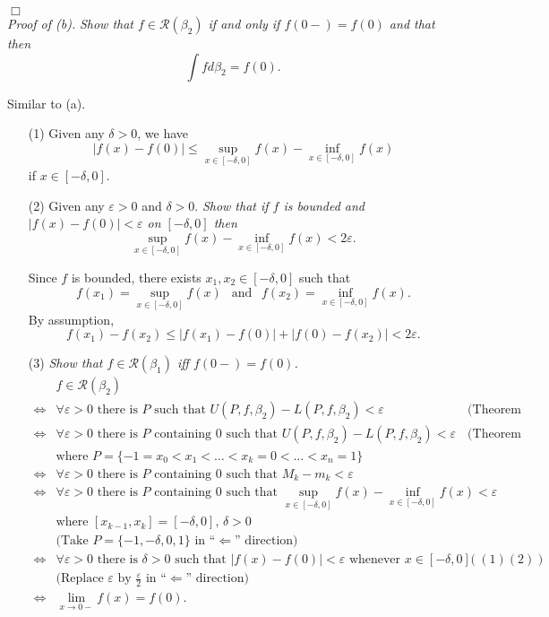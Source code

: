 \documentclass{article}
\begin{document}
$\Box$ \\



\emph{Proof of (b).}
\emph{Show that $f \in \mathscr{R}(\beta_2)$ if and only if $f(0-) = f(0)$ and that then
\[
  \int f d\beta_2 = f(0).
\]}

Similar to (a).
\begin{enumerate}
\item[(1)]
  Given any $\delta > 0$,
  we have
  \[
    |f(x) - f(0)| \leq \sup_{x\in[-\delta,0]} f(x) - \inf_{x\in[-\delta,0]} f(x)
  \]
  if $x \in [-\delta,0]$.

\item[(2)]
  Given any $\varepsilon > 0$ and $\delta > 0$.
  \emph{Show that if $f$ is bounded and $|f(x) - f(0)| < \varepsilon$ on $[-\delta,0]$ then
  \[
    \sup_{x\in[-\delta,0]} f(x) - \inf_{x\in[-\delta,0]} f(x) < 2\varepsilon.
  \]}

  Since $f$ is bounded, there exists $x_1,x_2 \in [-\delta,0]$
  such that
  \[
    f(x_1) = \sup_{x\in[-\delta,0]} f(x) \:\: \text{ and } \:\:
    f(x_2) = \inf_{x\in[-\delta,0]} f(x).
  \]
  By assumption,
  \[
    f(x_1) - f(x_2) \leq |f(x_1) - f(0)| + |f(0) - f(x_2)| < 2\varepsilon.
  \]

\item[(3)]
\emph{Show that $f \in \mathscr{R}(\beta_1)$ iff $f(0-) = f(0)$.}
  \begin{align*}
    &f \in \mathscr{R}(\beta_2) \\
    \Longleftrightarrow&
      \text{$\forall \varepsilon > 0$ there is $P$ such that
      $U(P,f,\beta_2) - L(P,f,\beta_2) < \varepsilon$}
        &\text{(Theorem 6.6)} \\
    \Longleftrightarrow&
      \text{$\forall \varepsilon > 0$ there is $P$ containing $0$ such that
      $U(P,f,\beta_2) - L(P,f,\beta_2) < \varepsilon$}
        &\text{(Theorem 6.4)} \\
      &\text{where $P = \{-1 = x_0 < x_1 < \ldots < x_k = 0 < \ldots < x_n = 1\}$} \\
    \Longleftrightarrow&
      \text{$\forall \varepsilon > 0$ there is $P$ containing $0$ such that
      $M_{k} - m_{k} < \varepsilon$} \\
    \Longleftrightarrow&
      \text{$\forall \varepsilon > 0$ there is $P$ containing $0$ such that
      $\sup_{x\in[-\delta,0]} f(x) - \inf_{x\in[-\delta,0]} f(x) < \varepsilon$} \\
      &\text{where $[x_{k-1},x_{k}] = [-\delta,0]$, $\delta > 0$} \\
      &\text{(Take $P = \{-1,-\delta,0,1\}$ in ``$\Longleftarrow$'' direction)} \\
    \Longleftrightarrow&
      \text{$\forall \varepsilon > 0$ there is $\delta > 0$ such that
      $|f(x) - f(0)| < \varepsilon$ whenever $x \in [-\delta,0]$}
        &((1)(2)) \\
      &\text{(Replace $\varepsilon$ by $\frac{\varepsilon}{2}$ in ``$\Longleftarrow$'' direction)} \\
    \Longleftrightarrow&
      \lim_{x \to 0-} f(x) = f(0).
  \end{align*}


\end{enumerate}
\end{document}
